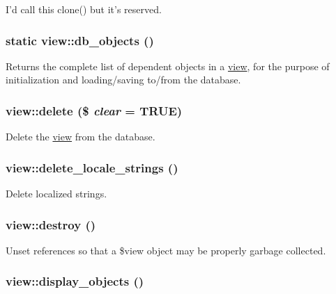 I'd call this clone() but it's reserved. \hypertarget{classview_a1f89288ab73c605c0271c6ce51d980a1}{
\subsubsection[{db\_\-objects}]{\setlength{\rightskip}{0pt plus 5cm}static view::db\_\-objects ()}}
\label{classview_a1f89288ab73c605c0271c6ce51d980a1}
Returns the complete list of dependent objects in a \hyperlink{classview}{view}, for the purpose of initialization and loading/saving to/from the database. \hypertarget{classview_aded9b6fb90cc3107254f6a98f910649f}{
\subsubsection[{delete}]{\setlength{\rightskip}{0pt plus 5cm}view::delete (\$ {\em clear} = {\ttfamily TRUE})}}
\label{classview_aded9b6fb90cc3107254f6a98f910649f}
Delete the \hyperlink{classview}{view} from the database. \hypertarget{classview_aecbca30cd57e551d5a13b8e1caf75a86}{
\subsubsection[{delete\_\-locale\_\-strings}]{\setlength{\rightskip}{0pt plus 5cm}view::delete\_\-locale\_\-strings ()}}
\label{classview_aecbca30cd57e551d5a13b8e1caf75a86}
Delete localized strings. \hypertarget{classview_acbe0d04120a4fe96759d84f5287e154d}{
\subsubsection[{destroy}]{\setlength{\rightskip}{0pt plus 5cm}view::destroy ()}}
\label{classview_acbe0d04120a4fe96759d84f5287e154d}
Unset references so that a \$view object may be properly garbage collected. \hypertarget{classview_a1338697759506981e17d1c4772b13aa6}{
\subsubsection[{display\_\-objects}]{\setlength{\rightskip}{0pt plus 5cm}view::display\_\-objects ()}}

